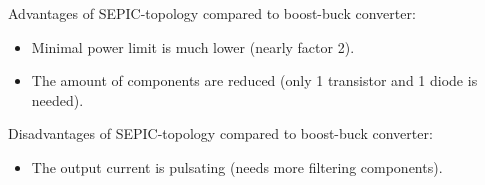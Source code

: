 

\begin{solutionblock}
    Advantages of SEPIC-topology compared to boost-buck converter:
    \begin{itemize}
        \item Minimal power limit is much lower (nearly factor 2).
        \item The amount of components are reduced (only 1 transistor and 1 diode is needed).
    \end{itemize}  
    Disadvantages of SEPIC-topology compared to boost-buck converter:
    \begin{itemize}
        \item The output current is pulsating (needs more filtering components).
    \end{itemize}  
\end{solutionblock}
